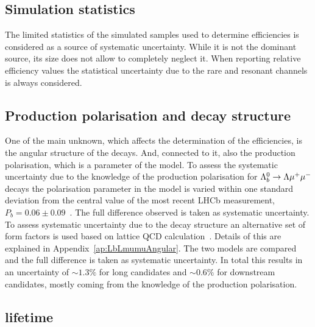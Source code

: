 \subsection{Simulation statistics}

The limited statistics of the simulated samples used to determine efficiencies is considered as a source of systematic uncertainty.
While it is not the dominant source, its size does not allow to completely neglect it.
When reporting relative efficiency values the statistical uncertainty due to the  rare and resonant channels
is always considered. 

\subsection{Production polarisation and decay structure}
\label{sec:BRpolsys}

One of the main unknown, which affects the determination of the efficiencies, is the angular structure of
the decays. And, connected to it, also the production polarisation, which is a parameter of the model.
%
To assess the systematic uncertainty due to the knowledge of the production polarisation for $\Lambda^0_b\rightarrow\Lambda\mu^+\mu^-$ decays
the polarisation parameter in the model is varied within one standard deviation from the central value of the
most recent LHCb measurement, $P_b = 0.06 \pm 0.09$~\cite{Aaij:2013oxa}. The full difference observed is
taken as systematic uncertainty. To assess systematic uncertainty due to the decay structure
an alternative set of form factors is used based on lattice QCD calculation~\cite{Detmold:2012vy}.
Details of this are explained in Appendix~\ref{ap:LbLmumuAngular}. The two models are compared and the full difference
is taken as systematic uncertainty.
%
In total this results in an uncertainty of $\sim 1.3\%$ for long candidates and $\sim 0.6\%$ for downstream
candidates, mostly coming from the knowledge of the production polarisation.

\subsection{\Lb lifetime}

